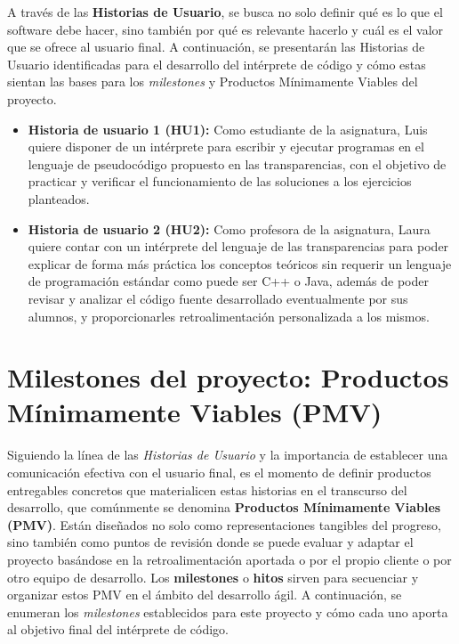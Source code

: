 A través de las \textbf{Historias de Usuario}, se busca no solo definir qué es lo que el software debe hacer, sino también por qué es relevante hacerlo y cuál es el valor que se ofrece al usuario final. A continuación, se presentarán las Historias de Usuario identificadas para el desarrollo del intérprete de código y cómo estas sientan las bases para los \textit{milestones} y Productos Mínimamente Viables del proyecto.

\begin{itemize}
    \item \textbf{Historia de usuario 1 (HU1):} Como estudiante de la asignatura, Luis quiere disponer de un intérprete para escribir y ejecutar programas en el lenguaje de pseudocódigo propuesto en las transparencias, con el objetivo de practicar y verificar el funcionamiento de las soluciones a los ejercicios planteados.
    \item \textbf{Historia de usuario 2 (HU2):} Como profesora de la asignatura, Laura quiere contar con un intérprete del lenguaje de las transparencias para poder explicar de forma más práctica los conceptos teóricos sin requerir un lenguaje de programación estándar como puede ser C++ o Java, además de poder revisar y analizar el código fuente desarrollado eventualmente por sus alumnos, y proporcionarles retroalimentación personalizada a los mismos.
\end{itemize}

\section{Milestones del proyecto: Productos Mínimamente Viables (PMV)}

Siguiendo la línea de las \textit{Historias de Usuario} y la importancia de establecer una comunicación efectiva con el usuario final, es el momento de definir productos entregables concretos que materialicen estas historias en el transcurso del desarrollo, que comúnmente se denomina \textbf{Productos Mínimamente Viables (PMV)}. Están diseñados no solo como representaciones tangibles del progreso, sino también como puntos de revisión donde se puede evaluar y adaptar el proyecto basándose en la retroalimentación aportada o por el propio cliente o por otro equipo de desarrollo. Los \textbf{milestones} o \textbf{hitos} sirven para secuenciar y organizar estos PMV en el ámbito del desarrollo ágil. A continuación, se enumeran los \textit{milestones} establecidos para este proyecto y cómo cada uno aporta al objetivo final del intérprete de código.

